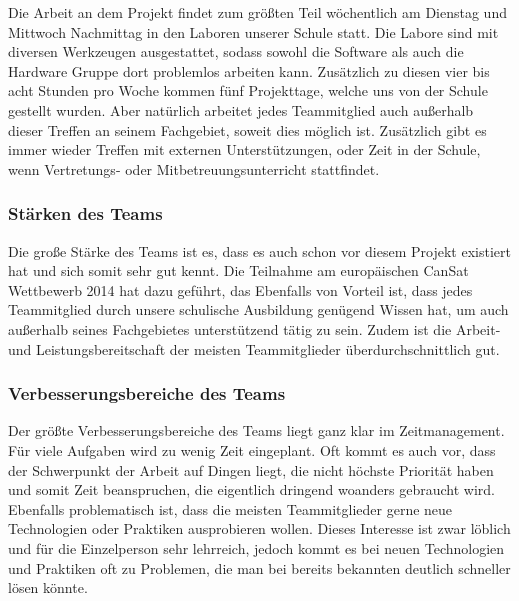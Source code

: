 Die Arbeit an dem Projekt findet zum größten Teil wöchentlich am Dienstag und Mittwoch Nachmittag in den Laboren unserer Schule statt. Die Labore sind mit diversen Werkzeugen ausgestattet, sodass sowohl die Software als auch die Hardware Gruppe dort problemlos arbeiten kann. Zusätzlich zu diesen vier bis acht Stunden pro Woche kommen fünf Projekttage, welche uns von der Schule gestellt wurden. Aber natürlich arbeitet jedes Teammitglied auch außerhalb dieser Treffen an seinem Fachgebiet, soweit dies möglich ist. Zusätzlich gibt es immer wieder Treffen mit externen Unterstützungen, oder Zeit in der Schule, wenn Vertretungs- oder Mitbetreuungsunterricht stattfindet.

\subsubsection{Stärken des Teams}
Die große Stärke des Teams ist es, dass es auch schon vor diesem Projekt existiert hat und sich somit sehr gut kennt. Die Teilnahme am europäischen CanSat Wettbewerb 2014 hat dazu geführt, das Ebenfalls von Vorteil ist, dass jedes Teammitglied durch unsere schulische Ausbildung genügend Wissen hat, um auch außerhalb seines Fachgebietes unterstützend tätig zu sein. Zudem ist die Arbeit- und Leistungsbereitschaft der meisten Teammitglieder überdurchschnittlich gut.

\subsubsection{Verbesserungsbereiche des Teams}
Der größte Verbesserungsbereiche des Teams liegt ganz klar im Zeitmanagement. Für viele Aufgaben wird zu wenig Zeit eingeplant. Oft kommt es auch vor, dass der Schwerpunkt der Arbeit auf Dingen liegt, die nicht höchste Priorität haben und somit Zeit beanspruchen, die eigentlich dringend woanders gebraucht wird. Ebenfalls problematisch ist, dass die meisten Teammitglieder gerne neue Technologien oder Praktiken ausprobieren wollen. Dieses Interesse ist zwar löblich und für die Einzelperson sehr lehrreich, jedoch kommt es bei neuen Technologien und Praktiken oft zu Problemen, die man bei bereits bekannten deutlich schneller lösen könnte.

